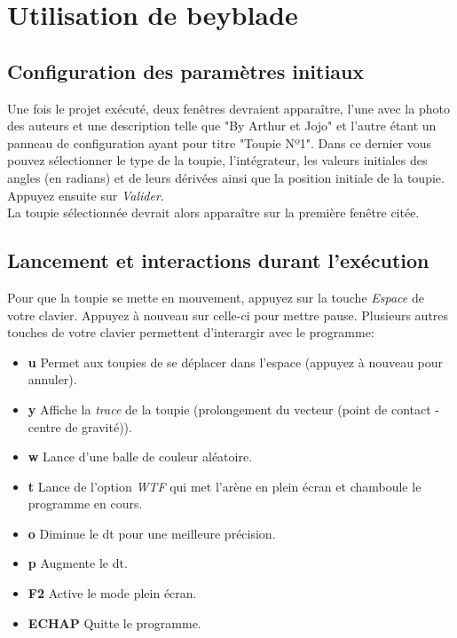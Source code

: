 \documentclass[a4paper]{article}%
\begin{document}
\section{Utilisation de beyblade}
	\subsection {Configuration des paramètres initiaux}
		Une fois le projet exécuté, deux fenêtres devraient apparaître, l'une avec la photo des auteurs et une description telle que "By Arthur et Jojo" et l'autre étant un panneau de configuration ayant pour titre "Toupie Nº1". Dans ce dernier vous pouvez sélectionner le type de la toupie, l'intégrateur, les valeurs initiales des angles (en radians) et de leurs dérivées ainsi que la position initiale de la toupie. Appuyez ensuite sur \emph{Valider}. \\
	
	La toupie sélectionnée devrait alors apparaître sur la première fenêtre citée. 
	\subsection {Lancement et interactions durant l'exécution}
		Pour que la toupie se mette en mouvement, appuyez sur  la touche \emph{Espace} de votre clavier. Appuyez à nouveau sur celle-ci pour mettre pause. Plusieurs autres touches de votre clavier permettent d'interargir avec le programme: 
		\begin {itemize} 
			\item[\textbf{u}] Permet aux toupies de se déplacer dans l'espace (appuyez à nouveau pour annuler).
			\item[\textbf{y}] Affiche la \emph{trace} de la toupie (prolongement du vecteur (point de contact - centre de gravité)).
			\item[\textbf{w}] Lance d'une balle de couleur aléatoire.
			\item[\textbf{t}] Lance de l'option \emph {WTF} qui met l'arène en plein écran et chamboule le programme en cours.
			\item[\textbf{o}] Diminue le dt pour une meilleure précision.
			\item[\textbf{p}] Augmente le dt.
			\item[\textbf{F2}] Active le mode plein écran.
			\item[\textbf{ECHAP}] Quitte le programme.
			
		\end {itemize}
\end{document}
